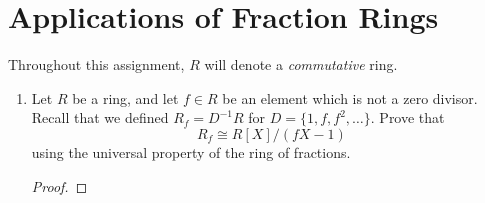 \documentclass[../psets.tex]{subfiles}
\begin{document}
\section{Applications of Fraction Rings}
Throughout this assignment, $R$ will denote a \emph{commutative} ring.
\begin{enumerate}
    \item {}Let $R$ be a ring, and let $f\in R$ be an element which is not a zero divisor. Recall that we defined $R_f=D^{-1}R$ for $D=\{1,f,f^2,\dots\}$. Prove that
    \begin{equation*}
        R_f \cong R[X]/(fX-1)
    \end{equation*}
    using the universal property of the ring of fractions.
    \begin{proof}






        
        

\end{proof}
\end{enumerate}
\end{document}
